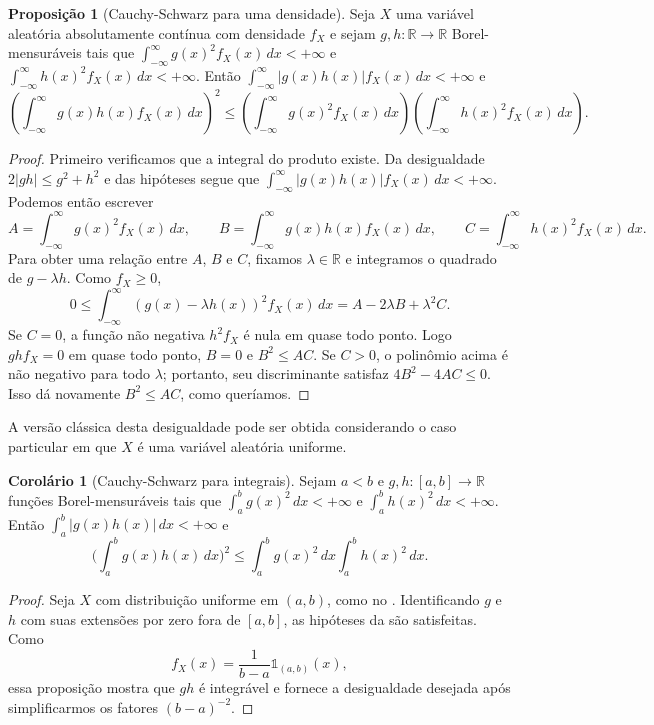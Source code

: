 \documentclass[12pt,portuguese]{article}
\theoremstyle{definition}
\newtheorem{proposition}[proposition]{Proposição}
\newtheorem{corollary}[corollary]{Corolário}
\theoremstyle{plainexercise}
\theoremstyle{starredexercise}
\theoremstyle{definition}
\begin{document}
\begin{proposition}[Cauchy-Schwarz para uma densidade]
  \label{prop:cauchy-schwarz}
  Seja $X$ uma variável aleatória absolutamente contínua com densidade
  $f_X$ e sejam $g,h:\mathbb{R}\to\mathbb{R}$ Borel-mensuráveis tais que
  $\int_{-\infty}^{\infty}g(x)^2f_X(x)\,dx<+\infty$ e
  $\int_{-\infty}^{\infty}h(x)^2f_X(x)\,dx<+\infty$. Então
  $\int_{-\infty}^{\infty}|g(x)h(x)|f_X(x)\,dx<+\infty$ e
  \[
    \left(\int_{-\infty}^{\infty}g(x)h(x)f_X(x)\,dx\right)^2
    \leqslant
    \left(\int_{-\infty}^{\infty}g(x)^2f_X(x)\,dx\right)
    \left(\int_{-\infty}^{\infty}h(x)^2f_X(x)\,dx\right).
  \]
\end{proposition}

\begin{proof}
Primeiro verificamos que a integral do produto existe. Da desigualdade
$2|gh|\leqslant g^2+h^2$ e das hipóteses segue que
$\int_{-\infty}^{\infty}|g(x)h(x)|f_X(x)\,dx<+\infty$.
Podemos então escrever
\[
  A=\int_{-\infty}^{\infty}g(x)^2f_X(x)\,dx,\qquad
  B=\int_{-\infty}^{\infty}g(x)h(x)f_X(x)\,dx,\qquad
  C=\int_{-\infty}^{\infty}h(x)^2f_X(x)\,dx.
\]
Para obter uma relação entre $A$, $B$ e $C$, fixamos
$\lambda\in\mathbb{R}$ e integramos o quadrado de $g-\lambda h$.
Como $f_X\geqslant0$,
\[
  0\leqslant\int_{-\infty}^{\infty}
  (g(x)-\lambda h(x))^2f_X(x)\,dx
  =A-2\lambda B+\lambda^2C.
\]
Se $C=0$, a função não negativa $h^2f_X$ é nula em quase todo ponto.
Logo $ghf_X=0$ em quase todo ponto, $B=0$ e $B^2\leqslant AC$.
Se $C>0$, o polinômio acima é não negativo para todo $\lambda$;
portanto, seu discriminante satisfaz $4B^2-4AC\leqslant0$. Isso dá
novamente $B^2\leqslant AC$, como queríamos.
\end{proof}

A versão clássica desta desigualdade pode ser obtida considerando
o caso particular em que $X$ é uma variável aleatória uniforme.

\begin{corollary}[Cauchy-Schwarz para
  integrais]\label{cor:cauchy-schwarz-integral}
  Sejam $a < b$ e $g,h:[a,b]\to\mathbb{R}$ funções Borel-mensuráveis
  tais que $\int_a^b g(x)^2\,dx<+\infty$ e
  $\int_a^b h(x)^2\,dx<+\infty$. Então
  $\int_a^b|g(x)h(x)|\,dx<+\infty$ e
  \[
    \biggl(\int_a^b g(x)h(x)\,dx\biggr)^{\!2}
    \leqslant
    \int_a^b g(x)^2\,dx \int_a^b h(x)^2\,dx.
  \]
\end{corollary}

\begin{proof}
  Seja $X$ com distribuição uniforme em $(a, b)$, como no
  . Identificando $g$ e $h$ com suas extensões
  por zero fora de $[a, b]$, as hipóteses da
   são satisfeitas. Como
  \[
    f_X(x)=\frac{1}{b-a}\mathds{1}_{(a,b)}(x),
  \]
  essa proposição mostra que $gh$ é integrável e fornece a desigualdade
  desejada após simplificarmos os fatores $(b-a)^{-2}$.
\end{proof}
\end{document}
